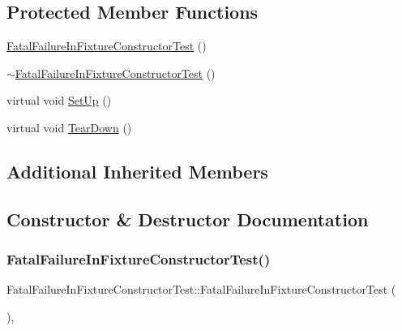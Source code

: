 \subsection*{Protected Member Functions}
\begin{DoxyCompactItemize}
\item 
\hyperlink{class_fatal_failure_in_fixture_constructor_test_a1dc9a5fcf0e1f22d614990a0fe2cb504}{Fatal\+Failure\+In\+Fixture\+Constructor\+Test} ()
\item 
\hyperlink{class_fatal_failure_in_fixture_constructor_test_a514709af7159172a12193a7508683c46}{$\sim$\+Fatal\+Failure\+In\+Fixture\+Constructor\+Test} ()
\item 
virtual void \hyperlink{class_fatal_failure_in_fixture_constructor_test_a006d3ac0e7a4ad3c469c3b41dc7c42c3}{Set\+Up} ()
\item 
virtual void \hyperlink{class_fatal_failure_in_fixture_constructor_test_a2763026a557e1fce4e59bd16c4eced57}{Tear\+Down} ()
\end{DoxyCompactItemize}
\subsection*{Additional Inherited Members}


\subsection{Constructor \& Destructor Documentation}
\mbox{\label{class_fatal_failure_in_fixture_constructor_test_a1dc9a5fcf0e1f22d614990a0fe2cb504}} 
\subsubsection{\texorpdfstring{Fatal\+Failure\+In\+Fixture\+Constructor\+Test()}{FatalFailureInFixtureConstructorTest()}}
{\footnotesize\ttfamily Fatal\+Failure\+In\+Fixture\+Constructor\+Test\+::\+Fatal\+Failure\+In\+Fixture\+Constructor\+Test (\begin{DoxyParamCaption}{ }\end{DoxyParamCaption})\hspace{0.3cm}{\ttfamily [inline]}, {\ttfamily [protected]}}


